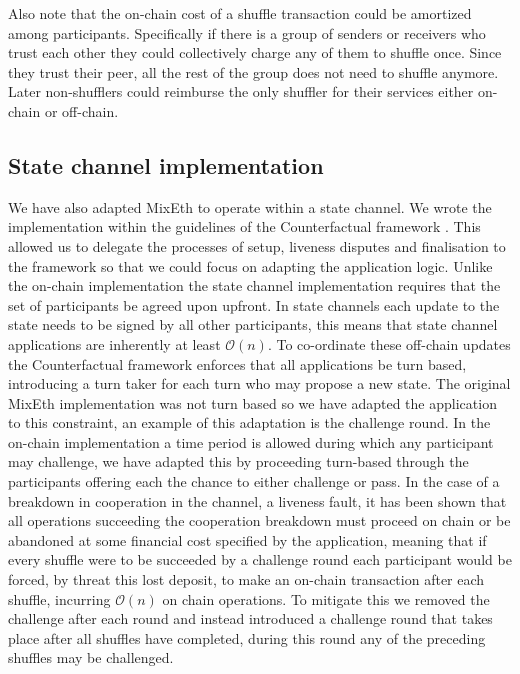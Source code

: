 \documentclass[a4paper]{article}
\theoremstyle{definition}
\begin{document}
Also note that the on-chain cost of a shuffle transaction could be amortized among participants. Specifically if there is a group of senders or receivers who trust each other they could collectively charge any of them to shuffle once. Since they trust their peer, all the rest of the group does not need to shuffle anymore. Later non-shufflers could reimburse the only shuffler for their services either on-chain or off-chain. 
        
\subsection{State channel implementation} \label{statechannelimpl}

We have also adapted MixEth to operate within a state channel. We wrote the implementation within the guidelines of the Counterfactual framework \cite{coleman2018counterfactual}. This allowed us to delegate the processes of setup, liveness disputes and finalisation to the framework so that we could focus on adapting the application logic. Unlike the on-chain implementation the state channel implementation requires that the set of participants be agreed upon upfront. In state channels each update to the state needs to be signed by all other participants, this means that state channel applications are inherently at least $\mathcal{O}(n)$. To co-ordinate these off-chain updates the Counterfactual framework enforces that all applications be turn based, introducing a turn taker for each turn who may propose a new state. The original MixEth implementation was not turn based so we have adapted the application to this constraint, an example of this adaptation is the challenge round. In the on-chain implementation a time period is allowed during which any participant may challenge, we have adapted this by proceeding turn-based through the participants offering each the chance to either challenge or pass. In the case of a breakdown in cooperation in the channel, a liveness fault, it has been shown that all operations succeeding the cooperation breakdown must proceed on chain\cite{mccorryyou} or be abandoned at some financial cost specified by the application, meaning that if every shuffle were to be succeeded by a challenge round each participant would be forced, by threat this lost deposit, to make an on-chain transaction after each shuffle, incurring $\mathcal{O}(n)$ on chain operations. To mitigate this we removed the challenge after each round and instead introduced a challenge round that takes place after all shuffles have completed, during this round any of the preceding shuffles may be challenged.
\end{document}
